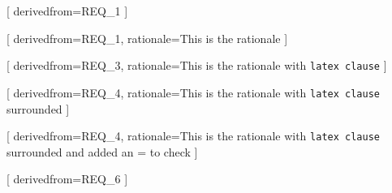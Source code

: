 


[
  derivedfrom=REQ\_1
]

[
  derivedfrom=REQ\_1,
  rationale=This is the rationale
]

[
  derivedfrom=REQ\_3,
  rationale=This is the rationale with \texttt{latex clause}
]

[
  derivedfrom=REQ\_4,
  rationale={This is the rationale with \texttt{latex clause} surrounded}
]

[
  derivedfrom=REQ\_4,
  rationale={This is the rationale with \texttt{latex clause} surrounded and added an = to check}
]

[
  derivedfrom=REQ\_6
]
